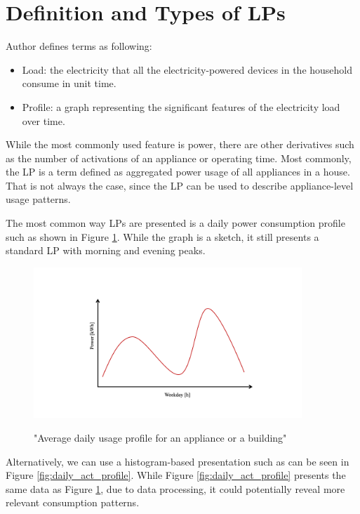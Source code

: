 
\section{Definition and Types of LPs}
\label{sec:LP_types}
Author \cite{Review2021} defines terms as following:

\begin{itemize}
	\item Load: the electricity that all the electricity-powered devices in the household consume in unit time.
	\item Profile: a graph representing the significant features of the electricity load over time.
\end{itemize}

While the most commonly used feature is power, there are other derivatives such as the number of activations of an appliance or operating time.
Most commonly, the LP is a term defined as aggregated power usage of all appliances in a house.
That is not always the case, since the LP can be used to describe appliance-level usage patterns. 

The most common way LPs are presented is a daily power consumption profile such as shown in Figure \ref{fig:daily_power_profile}. 
While the graph is a sketch, it still presents a standard LP with morning and evening peaks.

\begin{figure}[H]
	\centering
	\caption{"Average daily usage profile for an appliance or a building"}
	\includegraphics[width=0.9\textwidth]{Figures/profile_sketches/Slide1.png}
	\label{fig:daily_power_profile}
\end{figure}

Alternatively, we can use a histogram-based presentation such as can be seen in Figure \ref{fig:daily_act_profile}.
While Figure \ref{fig:daily_act_profile} presents the same data as Figure \ref{fig:daily_power_profile},
due to data processing, it could potentially reveal more relevant consumption patterns.

